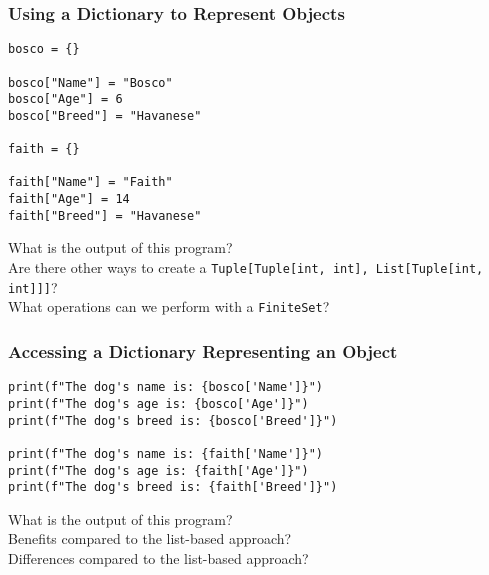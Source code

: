 \documentclass[14pt,aspectratio=169]{beamer}
\begin{document}
%
\begin{frame}[fragile]
  \frametitle{Using a Dictionary to Represent Objects}
  \begin{minipage}{6in}
    \vspace*{.2in}
    \begin{verbatim}
bosco = {}

bosco["Name"] = "Bosco"
bosco["Age"] = 6
bosco["Breed"] = "Havanese"

faith = {}

faith["Name"] = "Faith"
faith["Age"] = 14
faith["Breed"] = "Havanese"
    \end{verbatim}
  \end{minipage}
  \vspace*{.25in}
  \begin{center}
    \normalsize \noindent What is the output of this program? \\
    \normalsize \noindent Are there other ways to create a {\tt Tuple[Tuple[int, int], List[Tuple[int, int]]]}? \\
    \normalsize \noindent What operations can we perform with a {\tt FiniteSet}? \\
  \end{center}
\end{frame}

%
\begin{frame}[fragile]
  \frametitle{Accessing a Dictionary Representing an Object}
  \hspace*{-.1in}
  \begin{minipage}{6in}
    \vspace*{.2in}
    \begin{verbatim}
print(f"The dog's name is: {bosco['Name']}")
print(f"The dog's age is: {bosco['Age']}")
print(f"The dog's breed is: {bosco['Breed']}")

print(f"The dog's name is: {faith['Name']}")
print(f"The dog's age is: {faith['Age']}")
print(f"The dog's breed is: {faith['Breed']}")
    \end{verbatim}
  \end{minipage}
  \vspace*{.1in}
  \begin{center}
    \normalsize \noindent What is the output of this program? \\
    \normalsize \noindent Benefits compared to the list-based approach? \\
    \normalsize \noindent Differences compared to the list-based approach? \\
  \end{center}
\end{frame}
\end{document}

